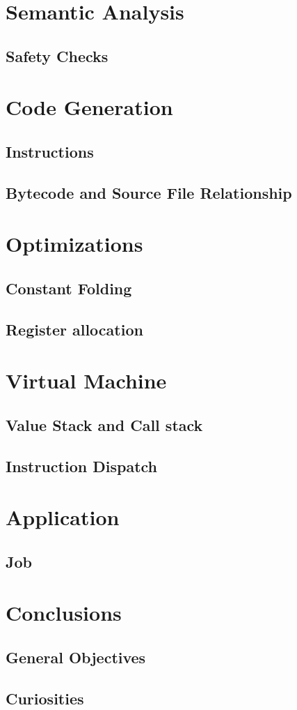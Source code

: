 \section{Semantic Analysis}
\subsection{Safety Checks}

\section{Code Generation}
\subsection{Instructions}

\subsection{Bytecode and Source File Relationship}

\section{Optimizations}
\subsection{Constant Folding}

\subsection{Register allocation}

\section{Virtual Machine}
\subsection{Value Stack and Call stack}

\subsection{Instruction Dispatch}

\section{Application}
\subsection{Job}

\section{Conclusions}
\subsection{General Objectives}

\subsection{Curiosities}




